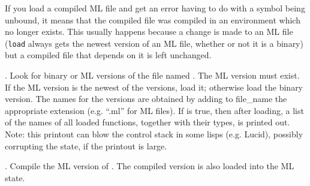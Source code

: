 If you load a compiled ML file and get an error having to do with a symbol
being unbound, it means that the compiled file was compiled in an
environment which no longer exists.  This usually happens because a change
is made to an ML file ({\tt load} always gets the newest version of an ML file,
whether or not it is a binary) but a compiled file that depends on it is
left unchanged.

\smallskip

.  Look for binary or ML
versions of the file named .  The ML version must exist.  If
the ML version is the newest of the versions, load it; otherwise load the
binary version.  The names for the versions are obtained by adding to
file\_name the appropriate extension (e.g.  ``.ml'' for ML files).  If
 is true, then after loading, a list of the names of all loaded
functions, together with their types, is printed out.  Note: this printout
can blow the control stack in some lisps (e.g. Lucid), possibly corrupting
the state, if the printout is large.

\smallskip

.
Compile the ML version of
.  The compiled version is also loaded into the
ML state.






